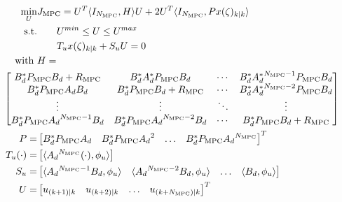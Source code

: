 \begin{equation} \label{eq:MPC_QP}
    \begin{aligned}
        \min_{U} &J_{\mathrm{MPC}} = U^T \langle I_{N_{\mathrm{MPC}}},H \rangle U + 2U^T \langle I_{N_{\mathrm{MPC}}}, P x(\zeta)_{k|k} \rangle \\
        \text{s.t.} &\qquad U^{min} \leq U \leq U^{max} \\
        &\qquad T_u {x}(\zeta)_{k|k} + S_u U = 0
        \, \\
        \text{with } &H = \\
        &\hspace{-3.5em }\begin{bmatrix}
            {B}_d^\ast P_{\mathrm{MPC}} {B}_d + {R_{\mathrm{MPC}}} & {B}_d^\ast {A}_d^\ast P_{\mathrm{MPC}} {B}_d & \cdots &  {B}_d^\ast {{A}_d^\ast}^{N_{\mathrm{MPC}}-1} P_{\mathrm{MPC}} {B}_d \\
            {B}_d^\ast P_{\mathrm{MPC}} {A}_d {B}_d & {B}_d^\ast P_{\mathrm{MPC}} {B}_d + {R_{\mathrm{MPC}}} & \cdots & {B}_d^\ast {{A}_d^\ast}^{N_{\mathrm{MPC}}-2} P_{\mathrm{MPC}} {B}_d \\
            \vdots & \vdots & \ddots & \vdots \\
            {B}_d^\ast P_{\mathrm{MPC}} {{A}_d}^{N_{\mathrm{MPC}}-1} {B}_d & {B}_d^\ast P_{\mathrm{MPC}} {{A}_d}^{N_{\mathrm{MPC}}-2} {B}_d & \cdots & {B}_d^\ast P_{\mathrm{MPC}} {B}_d + {R_{\mathrm{MPC}}}
        \end{bmatrix} \\
        P = &\begin{bmatrix}
            {B}_d^\ast P_{\mathrm{MPC}} {{A}_d} &
            {B}_d^\ast P_{\mathrm{MPC}} {{A}_d}^{2}  &
            \hdots & {B}_d^\ast P_{\mathrm{MPC}} {{A}_d}^{N_{\mathrm{MPC}}} 
        \end{bmatrix}^T \\
        T_u (\cdot) = &\begin{bmatrix}
            \langle {{A}_d}^{N_{\mathrm{MPC}}} (\cdot), {\phi_u} \rangle
        \end{bmatrix} \\
        S_u = &\begin{bmatrix}
            \langle {{A}_d}^{N_{\mathrm{MPC}}-1} {B}_d, {\phi_u} \rangle & 
            \langle {{A}_d}^{N_{\mathrm{MPC}}-2} {B}_d, {\phi_u} \rangle &
            \hdots &
            \langle {B}_d, {\phi_u} \rangle
        \end{bmatrix} \\
        U = &\begin{bmatrix}
            u_{(k+1)|k} & u_{(k+2)|k} & \hdots & u_{(k+N_{\mathrm{MPC}})|k}
        \end{bmatrix}^T
    \end{aligned}
\end{equation}

